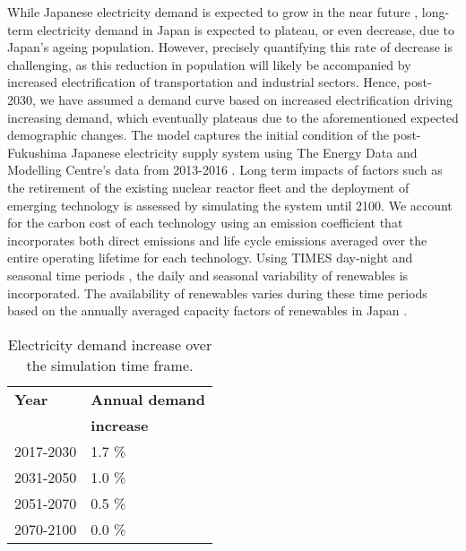 While Japanese electricity demand is expected to grow in the near future  \cite{noauthor_electricity_2019}, long-term electricity demand in Japan is expected to plateau, or even decrease, due to Japan's ageing population. However, precisely quantifying this rate of decrease is challenging, as this reduction in population will likely be accompanied by increased electrification of transportation and industrial sectors. Hence, post-2030, we have assumed a demand curve based on increased electrification driving increasing demand, which eventually plateaus due to the aforementioned expected demographic changes. The model captures the initial condition of the post-Fukushima Japanese electricity supply system using The Energy Data and Modelling Centre's data from 2013-2016 \cite{the_institute_of_energy_economics_japan_energy_2018}. Long term impacts of factors such as the retirement of the existing nuclear reactor fleet and the deployment of emerging technology is assessed by simulating the system until 2100. We account for the carbon cost of each technology using an emission coefficient that incorporates both direct emissions and life cycle emissions averaged over the entire operating lifetime for each technology. Using \gls{TIMES} day-night and seasonal time periods \cite{loulou_etsap-tiam_2008}, the daily and seasonal variability of renewables is incorporated. The availability of renewables varies during these time periods based on the annually averaged capacity factors of renewables in Japan \cite{the_institute_of_energy_economics_japan_energy_2018, irena_renewable_2020}.

\begin{table}[!ht]
\centering
	\caption{Electricity demand increase over the simulation time frame.}
	\vspace{0.1in}
	\begin{tabularx}{0.4\textwidth}{p{} p{}}
		\hline
\textbf{Year} & \textbf{Annual demand} \\
 & \textbf{increase} \\
\hline
2017-2030 & 1.7 \% \cite{noauthor_electricity_2019} \\
2031-2050 & 1.0 \% \\
2051-2070 & 0.5 \% \\
2070-2100 & 0.0 \% \\
\hline 
	\end{tabularx}
\label{demand}
\end{table}

